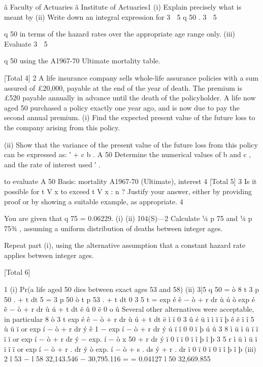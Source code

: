 ã Faculty of Actuaries
ã Institute of Actuaries1
(i) Explain precisely what is meant by
(ii) Write down an integral expression for
3  5
q 50 .
3  5

q 50 in terms of the hazard rates
over the appropriate age range only.
(iii)
Evaluate
3  5

q 50 using the A1967-70 Ultimate mortality table.

[Total 4]
2
A life insurance company sells whole-life assurance policies with a sum assured of
£20,000, payable at the end of the year of death. The premium is £520 payable
annually in advance until the death of the policyholder.
A life now aged 50 purchased a policy exactly one year ago, and is now due to pay
the second annual premium.
(i) Find the expected present value of the future loss to the company arising
from this policy.

(ii) Show that the variance of the present value of the future loss from this
policy can be expressed as:
′ + c
b . A 50
Determine the numerical values of b and c , and the rate of interest used
′ .

to evaluate A 50
Basis: mortality A1967-70 (Ultimate), interest 4%
[Total 5]
3
Is it possible for t V x to exceed t V x : n ? Justify your answer, either by providing
proof or by showing a suitable example, as appropriate.
4

You are given that q 75 = 0.06229.
(i)
(ii)
104(S)—2
Calculate 1⁄4 p 75 and 1⁄4 p 753⁄4 , assuming a uniform distribution of deaths
between integer ages.

Repeat part (i), using the alternative assumption that a constant hazard
rate applies between integer ages.

[Total 6]



1
(i) Pr(a life aged 50 dies between exact ages 53 and 58)
(ii) 3|5 q 50
= ò
8
t
3
p 50 .  + t dt
5
= 3 p 50 ò t p 53 .  + t dt
0
3
5
t
= exp é ê − ò  + r dr ù ú ò exp é ê − ò  + r dr ù ú  + t dt
ë
û
0
ë
0
o
û
Several other alternatives were acceptable, in particular
8
ò 3
t
exp é ê − ò  + r dr ù ú  + t dt
ë
ì
ï
0
3
û
é
ü
ï ì
ï
ï
þ ê
ë ï
î
5
ù
ü
ï
or exp í − ò  + r dr ý ê 1 − exp í − ò  + r dr ý ú
ï
î
0
0
ï
þ ú
û
3
8
ì
ü
ì
ü
ï
ï
ï
ï
or exp í − ò  + r dr ý − exp. í − ò \mu x 50 + r dr ý
ï 0
ï
ï 0
ï
î
þ
î
þ
3
5
r
ì
ü
ì
ü
ï
ï
ï
ï
or exp í − ò  + r . dr ý ò exp. í − ò  + s . ds ý  + r . dr
ï 0
ï 0
ï 0
ï
î
þ
î
þ
(iii)
2
l 53 − l 58 32,143.546 − 30,795.116
=
= 0.04127
l 50
32,669.855
 
